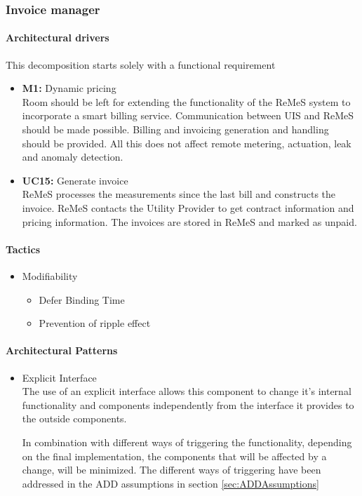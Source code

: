 \subsubsection{Invoice manager}

\paragraph{Architectural drivers}
This decomposition starts solely with a functional requirement
\begin{itemize}
	\item \textbf{M1: } Dynamic pricing\\
	Room should be left for extending the functionality of the ReMeS system to incorporate a smart billing service. 
Communication between UIS and ReMeS should be made possible.
Billing and invoicing generation and handling should be provided.
All this does not affect remote metering, actuation, leak and anomaly detection.
	\item \textbf{UC15: } Generate invoice\\
	ReMeS processes the measurements since the last bill and constructs the invoice.
	ReMeS contacts the Utility Provider to get contract information and pricing information.
	The invoices are stored in ReMeS and marked as unpaid.
\end{itemize}

\paragraph{Tactics}
\begin{itemize}
	\item Modifiability 
	\begin{itemize}
		\item Defer Binding Time\\
		\item Prevention of ripple effect\\
	\end{itemize}
\end{itemize}


\paragraph{Architectural Patterns}
\begin{itemize}
	\item{Explicit Interface}\\
	The use of an explicit interface allows this component to change it's internal functionality and components independently from the interface it provides to the outside components.

In combination with different ways of triggering the functionality, depending on the final implementation, the components that will be affected by a change, will be minimized. The different ways of triggering have been addressed in the ADD assumptions in section \ref{sec:ADDAssumptions} 
\end{itemize}


